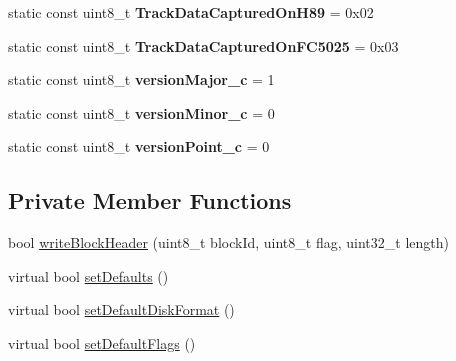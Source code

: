 \begin{DoxyCompactItemize}
\item 
\hypertarget{classH17Disk_a3bb6ae30d5b6c2b9332ec999cc4f2f96}{}static const uint8\+\_\+t {\bfseries Track\+Data\+Captured\+On\+H89} = 0x02\label{classH17Disk_a3bb6ae30d5b6c2b9332ec999cc4f2f96}

\item 
\hypertarget{classH17Disk_a8d298ae22c09c87f89a495bcf45ce203}{}static const uint8\+\_\+t {\bfseries Track\+Data\+Captured\+On\+F\+C5025} = 0x03\label{classH17Disk_a8d298ae22c09c87f89a495bcf45ce203}

\item 
\hypertarget{classH17Disk_af29b5cb1331413d4b684ca468179f32f}{}static const uint8\+\_\+t {\bfseries version\+Major\+\_\+c} = 1\label{classH17Disk_af29b5cb1331413d4b684ca468179f32f}

\item 
\hypertarget{classH17Disk_a4e4ed280004572abf1f811fd0c672945}{}static const uint8\+\_\+t {\bfseries version\+Minor\+\_\+c} = 0\label{classH17Disk_a4e4ed280004572abf1f811fd0c672945}

\item 
\hypertarget{classH17Disk_a7597129877594030fab087e982ac4b1a}{}static const uint8\+\_\+t {\bfseries version\+Point\+\_\+c} = 0\label{classH17Disk_a7597129877594030fab087e982ac4b1a}

\end{DoxyCompactItemize}
\subsection*{Private Member Functions}
\begin{DoxyCompactItemize}
\item 
bool \hyperlink{classH17Disk_a988a0510cf62884ebf3dc3fc9c43d0b8}{write\+Block\+Header} (uint8\+\_\+t block\+Id, uint8\+\_\+t flag, uint32\+\_\+t length)
\item 
virtual bool \hyperlink{classH17Disk_a6317e8bd90eed1f3785bcde079c72ae6}{set\+Defaults} ()
\item 
virtual bool \hyperlink{classH17Disk_ad8755a4e016bea07fd30796d7b6c1ca0}{set\+Default\+Disk\+Format} ()
\item 
virtual bool \hyperlink{classH17Disk_a78bd33233d9597f81e69db936efe5356}{set\+Default\+Flags} ()
\end{DoxyCompactItemize}
